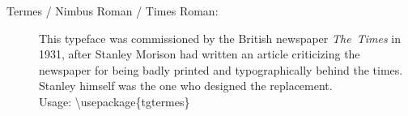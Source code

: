 \documentclass{article}
\begin{document}
\frenchspacing

\begin{description}
\item[Termes / Nimbus Roman / Times Roman:]
This typeface was commissioned by the British newspaper \emph{The~Times} in
1931, after Stanley Morison had written an article criticizing
the newspaper for being badly printed and typographically behind the
times.  Stanley himself was the one who designed the replacement.\\
Usage: \textbackslash usepackage\{tgtermes\}
\end{description}
\end{document}

